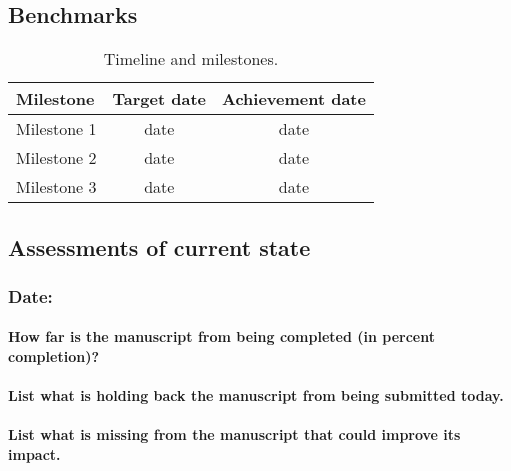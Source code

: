 \documentclass[10pt,letterpaper]{article}
\begin{document}
\begin{description}
\subsection{Benchmarks}

\begin{table}[htp] %
\caption{Timeline and milestones.}
\label{tab:timeline}
\begin{center}
\begin{tabular}{lcc}
\toprule
Milestone  & Target date & Achievement date\\
\midrule
Milestone 1                      & date  & date \\
Milestone 2                      & date  & date \\
Milestone 3                      & date  & date  \\ 
\bottomrule
\end{tabular}
\end{center}
\end{table}


\subsection{Assessments of current state}

\subsubsection{Date: }
\paragraph{How far is the manuscript from being completed (in percent completion)?}

\paragraph{List what is holding back the manuscript from being submitted today.}

\paragraph{List what is missing from the manuscript that could improve its impact.}


\end{description}
\end{document}
